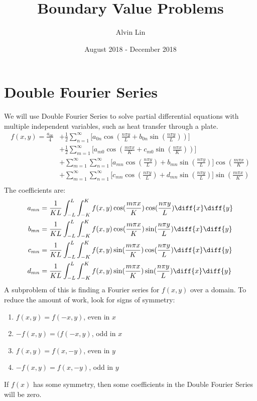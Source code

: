 \documentclass{math}
\title{Boundary Value Problems}
\author{Alvin Lin}
\date{August 2018 - December 2018}
\begin{document}
\maketitle

\section*{Double Fourier Series}
We will use Double Fourier Series to solve partial differential equations with
multiple independent variables, such as heat transfer through a plate.
\begin{align*}
  f(x,y) = \frac{a_{00}}{4}&+\frac{1}{2}\sum_{n=1}^{\infty}
    \bigg[a_{0n}\cos(\frac{n\pi y}{L}+b_{0n}\sin(\frac{n\pi y}{L}))\bigg] \\
  &+\frac{1}{2}\sum_{m=1}^{\infty}
    \bigg[a_{m0}\cos(\frac{m\pi x}{K}+c_{m0}\sin(\frac{n\pi x}{K}))\bigg] \\
  &+\sum_{m=1}^{\infty}\sum_{n=1}^{\infty}
    \bigg[a_{mn}\cos(\frac{n\pi y}{L})+b_{mn}\sin(\frac{n\pi y}{L})\bigg]
      \cos(\frac{m\pi x}{K}) \\
  &+\sum_{m=1}^{\infty}\sum_{n=1}^{\infty}
    \bigg[c_{mn}\cos(\frac{n\pi y}{L})+d_{mn}\sin(\frac{n\pi y}{L})\bigg]
      \sin(\frac{m\pi x}{K}) \\
\end{align*}
The coefficients are:
\begin{align*}
  a_{mn} &= \frac{1}{KL}\int_{-L}^{L}\int_{-K}^{K}f(x,y)\cos(\frac{m\pi x}{K})
    \cos(\frac{n\pi y}{L})\diff{x}\diff{y} \\
  b_{mn} &= \frac{1}{KL}\int_{-L}^{L}\int_{-K}^{K}f(x,y)\cos(\frac{m\pi x}{K})
    \sin(\frac{n\pi y}{L})\diff{x}\diff{y} \\
  c_{mn} &= \frac{1}{KL}\int_{-L}^{L}\int_{-K}^{K}f(x,y)\sin(\frac{m\pi x}{K})
    \cos(\frac{n\pi y}{L})\diff{x}\diff{y} \\
  d_{mn} &= \frac{1}{KL}\int_{-L}^{L}\int_{-K}^{K}f(x,y)\sin(\frac{m\pi x}{K})
    \sin(\frac{n\pi y}{L})\diff{x}\diff{y} \\
\end{align*}
A subproblem of this is finding a Fourier series for \( f(x,y) \) over a domain.
To reduce the amount of work, look for signs of symmetry:
\begin{enumerate}
  \item \( f(x,y) = f(-x,y) \), even in \( x \)
  \item \( -f(x,y) = (f(-x,y) \), odd in \( x \)
  \item \( f(x,y) = f(x,-y) \), even in \( y \)
  \item \( -f(x,y) = f(x,-y) \), odd in \( y \)
\end{enumerate}
If \( f(x) \) has some symmetry, then some coefficients in the Double Fourier
Series will be zero.
\end{document}

